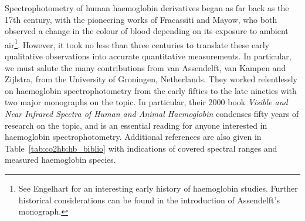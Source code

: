 Spectrophotometry of human haemoglobin derivatives began as far back as the 17th century, with the pioneering works of Fracassiti\cite{fracassati1667} and Mayow\cite{mayow1674}, who both observed a change in the colour of blood depending on its exposure to ambient air\footnote{See Engelhart for an interesting early history of haemoglobin studies\cite{engelhart1827}. Further historical considerations can be found in the introduction of Assendelft's monograph\cite[Chap.~1]{assendelft1970}.}. However, it took no less than three centuries to translate these early qualitative observations into accurate quantitative measurements. In particular, we must salute the many contributions from van Assendelft, van Kampen and Zijlstra, from the University of Groningen, Netherlands. They worked relentlessly on haemoglobin spectrophotometry from the early fifties to the late nineties with two major monographs on the topic\cite{assendelft1970, zijlstra2000}. In particular, their 2000 book \textit{Visible and Near Infrared Spectra of Human and Animal Haemoglobin} condenses fifty years of research on the topic, and is an essential reading for anyone interested in haemoglobin spectrophotometry. Additional references are also given in Table~\ref{tab:co2hb:hb_biblio} with indications of covered spectral ranges and measured haemoglobin species.

